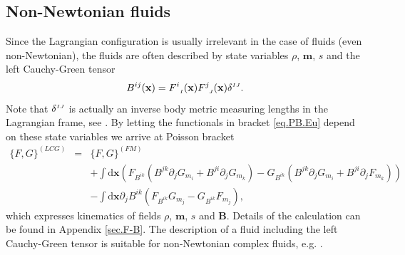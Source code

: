 \documentclass[
10pt, %
a4paper, %
oneside, %
headinclude,footinclude, %
BCOR5mm, %
]{scrartcl}
\newcommand{\xx}{\mathbf{x}}
\newcommand{\dx}{\mathrm{d}\xx}
\newcommand{\mm}{\mathbf{m}}
\newcommand{\BB}{\mathbf{B}}
\newcommand{\IP}[1]{{\color{Red}IP:\ \ #1}}
\newcommand{\sI}{{\mathsmaller I}}
\newcommand{\sJ}{{\mathsmaller J}}
\newcommand{\F}[2]{F^{#1}_{\ \, \mathsmaller#2}}
\newcommand{\Ffunc}{F}
\newcommand{\Gfunc}{G}
\begin{document}
\subsection{Non-Newtonian fluids}


Since the Lagrangian configuration is usually irrelevant in the case of fluids (even non-Newtonian), the fluids are often described by state variables $\rho$, $\mm$, $s$ and the left Cauchy-Green tensor
\begin{equation}
	B^{ij}(\xx) = \F{i}{I}(\xx) \F{j}{J}(\xx) \delta^{\sI\sJ}.
\end{equation}
Note that $\delta^{\sI\sJ}$ is actually an inverse body metric measuring 
lengths in the Lagrangian frame, see \cite{Simo1988,Tamas-kinematics}. By 
letting the functionals in bracket \eqref{eq.PB.Eu} depend on these state 
variables we arrive at Poisson bracket
\begin{eqnarray}\label{eq.PB.B}
	\{\Ffunc,\Gfunc\}^{(LCG)} &=& \{\Ffunc,\Gfunc\}^{(FM)} \nonumber\\
	&&+ \int\dx \left(\Ffunc_{B^{ik}}(B^{jk}\partial_j 
	\Gfunc_{m_i}+B^{ji}\partial_j 
	\Gfunc_{m_k})-\Gfunc_{B^{ik}}(B^{jk}\partial_j \Gfunc_{m_i}+B^{ji}\partial_j
	 \Ffunc_{m_k})\right)\nonumber\\
	&&-\int\dx \partial_j 
	B^{ik}(\Ffunc_{B^{ik}}\Gfunc_{m_j}-\Gfunc_{B^{ik}}\Ffunc_{m_j}),
\end{eqnarray}
which expresses kinematics of fields $\rho$, $\mm$, $s$ and $\BB$.
Details of the calculation can be found in Appendix \ref{sec.F-B}. The description of a fluid including the left Cauchy-Green tensor is suitable for non-Newtonian complex fluids, e.g. \cite{Malek-Maxwell}.
\end{document}
